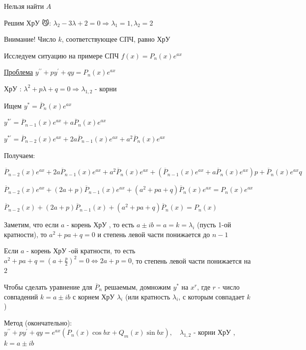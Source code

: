 \documentclass[12pt]{article}
\begin{document}
    Нельзя найти $A$

    Решим ХрУ 😼: $\lambda_2 - 3\lambda + 2 = 0 \Longrightarrow \lambda_1 = 1, \lambda_2 = 2$

    Внимание! Число $k$, соответствующее СПЧ, равно ХрУ \Cat

    \vspace{5mm}

    Исследуем ситуацию на примере СПЧ $f(x) = P_n(x) e^{ax}$

    \underline{Проблема} $y^{\prime\prime} + py^\prime + qy = P_n(x)e^{ax}$

    ХрУ \Cat: $\lambda^2 + p\lambda + q = 0 \Longrightarrow \lambda_{1,2}$ - корни

    \vspace{5mm}
    Ищем $y^* = \overline{P}_n(x) e^{ax}$

    $y^{*\prime} = \overline{P}_{n - 1} (x) e^{ax} + a\overline{P}_n(x) e^{ax}$

    $y^{*\prime} = \overline{P}_{n - 2} (x) e^{ax} + 2a\overline{P}_{n - 1} (x) e^{ax} + a^2\overline{P}_n(x) e^{ax}$

    \vspace{5mm}
    Получаем:

    $\overline{P}_{n - 2} (x) e^{ax} + 2a\overline{P}_{n - 1} (x) e^{ax} + a^2\overline{P}_n(x) e^{ax} + (\overline{P}_{n - 1} (x) e^{ax} + a\overline{P}_n(x) e^{ax})p + \overline{P}_n(x) e^{ax} q $

    $\overline{P}_{n - 2} (x) e^{ax} + (2a + p)\overline{P}_{n - 1} (x) e^{ax} + (a^2 + pa + q)\overline{P}_n(x) e^{ax} = P_n(x) e^{ax}$

    $\overline{P}_{n - 2} (x) + (2a + p)\overline{P}_{n - 1} (x) + (a^2 + pa + q)\overline{P}_n(x) = P_n(x)$

    Заметим, что если $a$ - корень ХрУ \Cat, то есть $a \pm ib = a = k = \lambda_i$ (пусть 1-ой кратности), то $a^2 + pa + q = 0$ и степень
    левой части понижается до $n - 1$

    Если $a$ - корень ХрУ -ой кратности, то есть $a^2 + pa + q = \left(a + \frac{p}{2}\right)^2 = 0 \Longleftrightarrow 2a + p = 0$, то степень левой части понижается на $2$

    Чтобы сделать уравнение для $\overline{P}_n$ решаемым, домножим $y^*$ на $x^r$, где $r$ - число совпадений $k = a \pm ib$ с корнем ХрУ $\lambda_i$ (или кратность $\lambda_i$, с которым совпадает $k$)

    \vspace{5mm}
    Метод (окончательно): $y^{\prime\prime} + py^\prime + qy = e^{ax} (P_n(x)\cos bx + Q_m (x)\sin bx), \quad \lambda_{1,2}$ - корни ХрУ \Cat, $k = a \pm ib$
\end{document}
